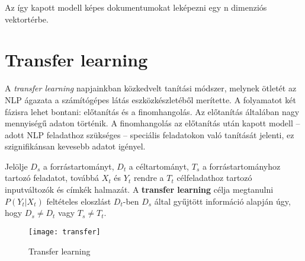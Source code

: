 Az így kapott modell képes dokumentumokat leképezni egy n dimenziós vektortérbe.

\section{Transfer learning}

A \textit{transfer learning} napjainkban közkedvelt tanítási módszer, melynek ötletét az NLP ágazata a számítógépes látás eszközkészletéből merítette. A folyamatot két fázisra lehet bontani: előtanítás és a finomhangolás. Az előtanítás általában nagy mennyiségű adaton történik. A finomhangolás az előtanítás után kapott modell – adott NLP feladathoz szükséges – speciális feladatokon való tanítását jelenti, ez szignifikánsan kevesebb adatot igényel.

\begin{definition}
	Jelölje $D_s$ a forrástartományt, $D_t$ a céltartományt, $T_s$ a forrástartományhoz tartozó feladatot, továbbá $X_t$ és $Y_t$ rendre a $T_t$ célfeladathoz tartozó inputváltozók és  címkék halmazát. A \textbf{transfer learning} célja megtanulni $P(Y_t|X_t)$ feltételes eloszlást $D_t$-ben $D_s$ által gyűjtött információ alapján úgy, hogy $D_s \neq D_t$ vagy $T_s \neq T_t$.	 
\end{definition}

\begin{figure}[H]
	\centering
	\texttt{[image: transfer]}
	\caption{Transfer learning}
\end{figure}







